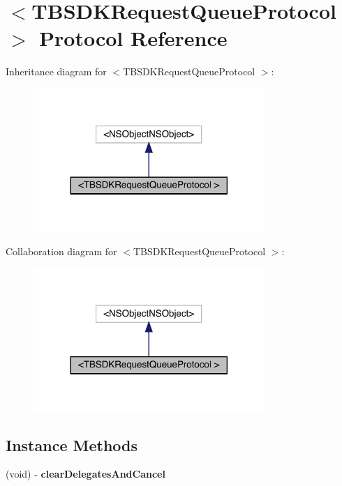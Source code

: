 \hypertarget{protocol_t_b_s_d_k_request_queue_protocol_01-p}{}\section{$<$T\+B\+S\+D\+K\+Request\+Queue\+Protocol $>$ Protocol Reference}
\label{protocol_t_b_s_d_k_request_queue_protocol_01-p}


Inheritance diagram for $<$T\+B\+S\+D\+K\+Request\+Queue\+Protocol $>$\+:\nopagebreak
\begin{figure}[H]
\begin{center}
\leavevmode
\includegraphics[width=248pt]{protocol_t_b_s_d_k_request_queue_protocol_01-p__inherit__graph}
\end{center}
\end{figure}


Collaboration diagram for $<$T\+B\+S\+D\+K\+Request\+Queue\+Protocol $>$\+:\nopagebreak
\begin{figure}[H]
\begin{center}
\leavevmode
\includegraphics[width=248pt]{protocol_t_b_s_d_k_request_queue_protocol_01-p__coll__graph}
\end{center}
\end{figure}
\subsection*{Instance Methods}
\begin{DoxyCompactItemize}
\item 
\mbox{\label{protocol_t_b_s_d_k_request_queue_protocol_01-p_aa4e715343ace6df2b6cc42a491490529}} 
(void) -\/ {\bfseries clear\+Delegates\+And\+Cancel}
\end{DoxyCompactItemize}
